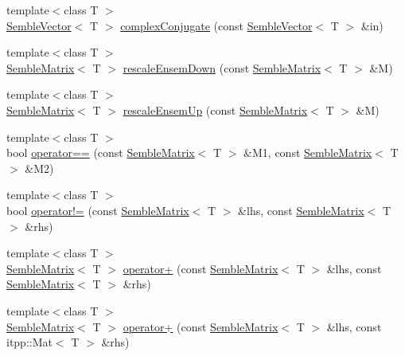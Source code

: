 \begin{DoxyCompactItemize}
\item 
{\footnotesize template$<$class T $>$ }\\\mbox{\hyperlink{structSEMBLE_1_1SembleVector}{Semble\+Vector}}$<$ T $>$ \mbox{\hyperlink{namespaceSEMBLE_a5f1a63fe2550d0f427f285f71e64b0a6}{complex\+Conjugate}} (const \mbox{\hyperlink{structSEMBLE_1_1SembleVector}{Semble\+Vector}}$<$ T $>$ \&in)
\item 
{\footnotesize template$<$class T $>$ }\\\mbox{\hyperlink{structSEMBLE_1_1SembleMatrix}{Semble\+Matrix}}$<$ T $>$ \mbox{\hyperlink{namespaceSEMBLE_a1a2a362abd2c9d5dfdcb8e914383c40b}{rescale\+Ensem\+Down}} (const \mbox{\hyperlink{structSEMBLE_1_1SembleMatrix}{Semble\+Matrix}}$<$ T $>$ \&M)
\item 
{\footnotesize template$<$class T $>$ }\\\mbox{\hyperlink{structSEMBLE_1_1SembleMatrix}{Semble\+Matrix}}$<$ T $>$ \mbox{\hyperlink{namespaceSEMBLE_ac55fb3abdab6794f5e717ff5c2e4931c}{rescale\+Ensem\+Up}} (const \mbox{\hyperlink{structSEMBLE_1_1SembleMatrix}{Semble\+Matrix}}$<$ T $>$ \&M)
\item 
{\footnotesize template$<$class T $>$ }\\bool \mbox{\hyperlink{namespaceSEMBLE_a04e3d846fff45a4b9a5b72b722bc949e}{operator==}} (const \mbox{\hyperlink{structSEMBLE_1_1SembleMatrix}{Semble\+Matrix}}$<$ T $>$ \&M1, const \mbox{\hyperlink{structSEMBLE_1_1SembleMatrix}{Semble\+Matrix}}$<$ T $>$ \&M2)
\item 
{\footnotesize template$<$class T $>$ }\\bool \mbox{\hyperlink{namespaceSEMBLE_a38cb07db0e226da61bdec6cba6723080}{operator!=}} (const \mbox{\hyperlink{structSEMBLE_1_1SembleMatrix}{Semble\+Matrix}}$<$ T $>$ \&lhs, const \mbox{\hyperlink{structSEMBLE_1_1SembleMatrix}{Semble\+Matrix}}$<$ T $>$ \&rhs)
\item 
{\footnotesize template$<$class T $>$ }\\\mbox{\hyperlink{structSEMBLE_1_1SembleMatrix}{Semble\+Matrix}}$<$ T $>$ \mbox{\hyperlink{namespaceSEMBLE_ac104727835e106d1d22472dd2abe9722}{operator+}} (const \mbox{\hyperlink{structSEMBLE_1_1SembleMatrix}{Semble\+Matrix}}$<$ T $>$ \&lhs, const \mbox{\hyperlink{structSEMBLE_1_1SembleMatrix}{Semble\+Matrix}}$<$ T $>$ \&rhs)
\item 
{\footnotesize template$<$class T $>$ }\\\mbox{\hyperlink{structSEMBLE_1_1SembleMatrix}{Semble\+Matrix}}$<$ T $>$ \mbox{\hyperlink{namespaceSEMBLE_a05f06146faa9f8202e65c4b5ea54b008}{operator+}} (const \mbox{\hyperlink{structSEMBLE_1_1SembleMatrix}{Semble\+Matrix}}$<$ T $>$ \&lhs, const itpp\+::\+Mat$<$ T $>$ \&rhs)

\end{DoxyCompactItemize}
